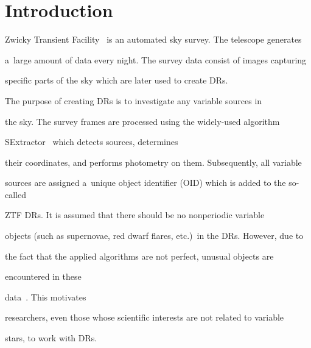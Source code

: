 


      \thispagestyle{myheadings}






\vspace*{-14pt}





\section{Introduction}



\noindent

Zwicky Transient Facility~\cite{2019PASP..131f8003B, 2019PASP..131a8002B} is an automated sky survey. The telescope generates 

a~large amount of data every night. The survey data consist of images capturing 

specific parts of the sky which are later used to create DRs.



The purpose of creating DRs is to investigate any variable sources in 

the sky. The survey frames are processed using the widely-used algorithm 

SExtractor~\cite{1996A&AS..117..393B} which detects sources, determines 

their coordinates, and performs photometry on them. Subsequently, all variable 

sources are assigned a~unique object identifier (OID) which is added to the so-called 

ZTF DRs. It is assumed that there should be no nonperiodic variable 

objects (such as supernovae, red dwarf flares, etc.)\ in the DRs. However, due to 

the fact that the applied algorithms are not perfect, unusual objects are 

encountered in these 

data~\cite{2021MNRAS.502.5147M,2023A&A...672A.111P,Chan_2022}. This motivates 

researchers, even those whose scientific interests are not related to variable 

stars, to work with DRs.



